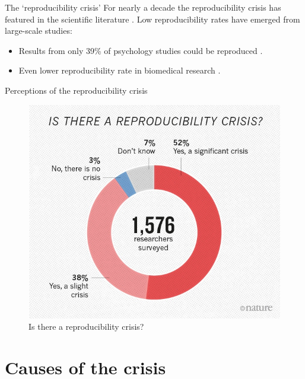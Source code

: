 \documentclass[aspectratio=169, 11pt]{beamer} %
\begin{document}
\begin{frame}{The `reproducibility crisis'}
  For nearly a decade the reproducibility crisis has featured in the scientific literature \cite{Jasny2011-bw, Baker2016-cf, Munafo2017-bj}. Low reproducibility rates have emerged from large-scale studies:
    \begin{itemize}[label=\textbullet]
        \item Results from only 39\% of psychology studies could be reproduced \cite{Open_Science_Collaboration2015-vf}.
        \item Even lower reproducibility rate in biomedical research \cite{Begley2012-xt,Prinz2011-za}.
    \end{itemize}
\end{frame}

\begin{frame}{Perceptions of the reproducibility crisis}
  \begin{figure}[H]
    \centering
        \includegraphics[height=.7\textheight]{figures/reproducibility-graphic-online1.jpeg}
        \caption{Is there a reproducibility crisis? \cite{Baker2016-cf}}
        \label{fig:Baker2016}
  \end{figure}
\end{frame}

\section{Causes of the crisis}
\end{document}
